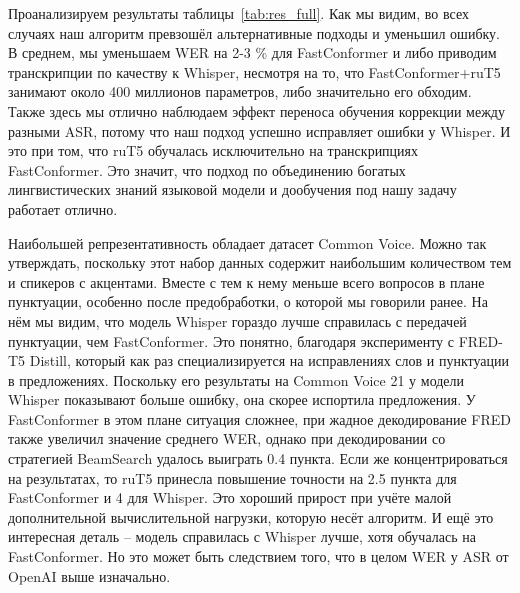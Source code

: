 Проанализируем результаты таблицы~\ref{tab:res_full}.
Как мы видим, во всех случаях наш алгоритм превзошёл альтернативные подходы и уменьшил ошибку.
В среднем, мы уменьшаем WER на 2-3 \% для FastConformer и либо приводим транскрипции по качеству к Whisper, несмотря на то, что FastConformer+ruT5 занимают около 400 миллионов параметров, либо значительно его обходим.
Также здесь мы отлично наблюдаем эффект переноса обучения коррекции между разными ASR, потому что наш подход успешно исправляет ошибки у Whisper.
И это при том, что ruT5 обучалась исключительно на транскрипциях FastConformer.
Это значит, что подход по объединению богатых лингвистических знаний языковой модели и дообучения под нашу задачу работает отлично.

Наибольшей репрезентативность обладает датасет Common Voice.
Можно так утверждать, поскольку этот набор данных содержит наибольшим количеством тем и спикеров с акцентами.
Вместе с тем к нему меньше всего вопросов в плане пунктуации, особенно после предобработки, о которой мы говорили ранее.
На нём мы видим, что модель Whisper гораздо лучше справилась с передачей пунктуации, чем FastConformer.
Это понятно, благодаря эксперименту с FRED-T5 Distill, который как раз специализируется на исправлениях слов и пунктуации в предложениях.
Поскольку его результаты на Common Voice 21 у модели Whisper показывают больше ошибку, она скорее испортила предложения.
У FastConformer в этом плане ситуация сложнее, при жадное декодирование FRED также увеличил значение среднего WER, однако при декодировании со стратегией BeamSearch удалось выиграть 0.4 пункта.
Если же концентрироваться на результатах, то ruT5 принесла повышение точности на 2.5 пункта для FastConformer и 4 для Whisper.
Это хороший прирост при учёте малой дополнительной вычислительной нагрузки, которую несёт алгоритм.
И ещё это интересная деталь -- модель справилась с Whisper лучше, хотя обучалась на FastConformer.
Но это может быть следствием того, что в целом WER у ASR от OpenAI выше изначально.


